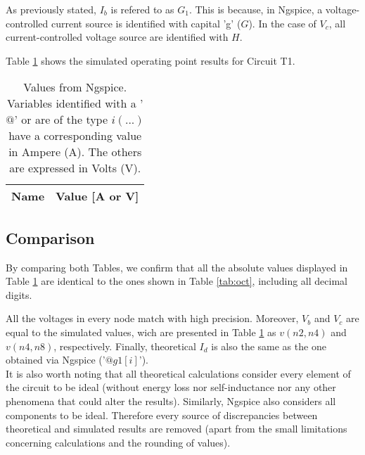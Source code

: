 As previously stated, $I_b$ is refered to as $G_1$. This is because, in Ngspice, a
voltage-controlled current source is identified with capital 'g' ($G$). In the case of
$V_c$, all current-controlled voltage source are identified with $H$.

Table \ref{tab:op} shows the simulated operating point results for Circuit T1.



\begin{table}[h]
	\centering
	\begin{tabular}{|l|r|}
		\hline    
		{\bf Name} & {\bf Value [A or V]} \\ \hline
    		
	\end{tabular}
	
	\caption{Values from Ngspice. Variables identified with a '$@$' or are of the type
	$i(...)$ have a corresponding value in Ampere (A). The others are expressed in Volts (V).}
    
\label{tab:op}
\end{table}




\subsection{Comparison}



By comparing both Tables, we confirm that all the absolute values displayed in Table \ref{tab:op}
are identical to the ones shown in Table \ref{tab:oct}, including all decimal digits.

All the voltages in every node match with high precision. Moreover, $V_b$ and $V_c$ are
equal to the simulated values, wich are presented in Table \ref{tab:op} as $v(n2,n4)$ and
$v(n4,n8)$, respectively. Finally, theoretical $I_d$ is also the same as the one obtained
via Ngspice ('$@g1[i]$'). \\

It is also worth noting that all theoretical calculations consider every element of the
circuit to be ideal (without energy loss nor self-inductance nor any other phenomena that could
alter the results). Similarly, Ngspice also considers all components to be ideal. Therefore
every source of discrepancies between theoretical and simulated results are removed (apart from
the small limitations concerning calculations and the rounding of values).

